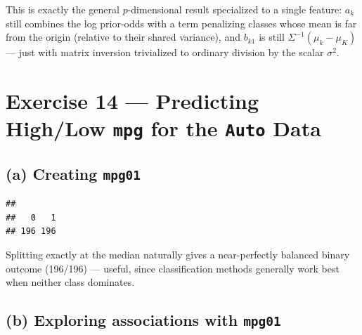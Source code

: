 \documentclass[
  11pt,
]{article}
\newenvironment{Shaded}{\begin{snugshade}}{\end{snugshade}}
\newcommand{\FunctionTok}[1]{\textcolor[rgb]{0.13,0.29,0.53}{\textbf{#1}}}
\newcommand{\NormalTok}[1]{#1}
\newcommand{\OtherTok}[1]{\textcolor[rgb]{0.56,0.35,0.01}{#1}}
\newcommand{\SpecialCharTok}[1]{\textcolor[rgb]{0.81,0.36,0.00}{\textbf{#1}}}
\begin{document}
This is exactly the general \(p\)-dimensional result specialized to a
single feature: \(a_k\) still combines the log prior-odds with a term
penalizing classes whose mean is far from the origin (relative to their
shared variance), and \(b_{k1}\) is still \(\Sigma^{-1}(\mu_k - \mu_K)\)
--- just with matrix inversion trivialized to ordinary division by the
scalar \(\sigma^2\).

\newpage

\section{\texorpdfstring{Exercise 14 --- Predicting High/Low
\texttt{mpg} for the \texttt{Auto}
Data}{Exercise 14 --- Predicting High/Low mpg for the Auto Data}}\label{exercise-14-predicting-highlow-mpg-for-the-auto-data}

\subsection{\texorpdfstring{(a) Creating
\texttt{mpg01}}{(a) Creating mpg01}}\label{a-creating-mpg01}

\begin{Shaded}
\end{Shaded}

\begin{verbatim}
## 
##   0   1 
## 196 196
\end{verbatim}

Splitting exactly at the median naturally gives a near-perfectly
balanced binary outcome (196/196) --- useful, since classification
methods generally work best when neither class dominates.

\subsection{\texorpdfstring{(b) Exploring associations with
\texttt{mpg01}}{(b) Exploring associations with mpg01}}\label{b-exploring-associations-with-mpg01}
\end{document}
